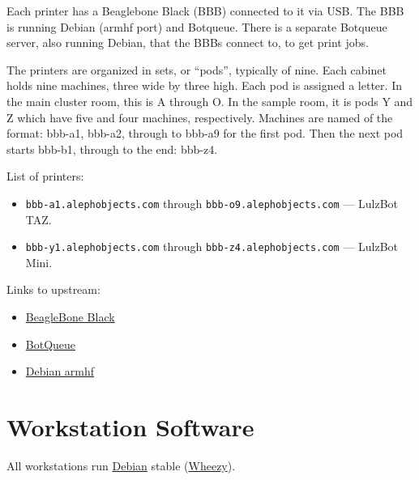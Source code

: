 Each printer has a Beaglebone Black (BBB) connected to it via USB. The
BBB is running Debian (armhf port) and Botqueue. There is a separate Botqueue
server, also running Debian, that the BBBs connect to, to get print jobs.

The printers are organized in sets, or ``pods'', typically of nine. Each cabinet
holds nine machines, three wide by three high. Each pod is assigned a letter.
In the main cluster room, this is A through O. In the sample room, it is pods
Y and Z which have five and four machines, respectively. Machines are named
of the format: bbb-a1, bbb-a2, through to bbb-a9 for the first pod. Then the
next pod starts bbb-b1, through to the end: bbb-z4.

List of printers:
\begin{itemize}
\item \texttt{bbb-a1.alephobjects.com} through
      \texttt{bbb-o9.alephobjects.com} --- LulzBot TAZ.
\item \texttt{bbb-y1.alephobjects.com} through
      \texttt{bbb-z4.alephobjects.com} --- LulzBot Mini.
\end{itemize}

Links to upstream:
\begin{itemize}
\item \href{http://beagleboard.org/}{BeagleBone Black}
\item \href{http://botqueue.org/}{BotQueue}
\item \href{https://wiki.debian.org/ArmHardFloatPort}{Debian armhf}
\end{itemize}

\section{Workstation Software}

All workstations run \href{http://www.debian.org/}{Debian} stable (\href{https://www.debian.org/releases/wheezy/}{Wheezy}).

